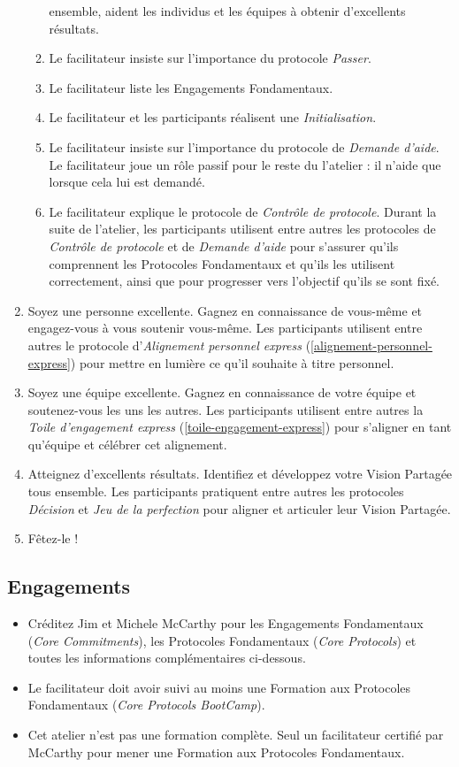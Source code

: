 \documentclass[paper=6in:9in,pagesize=pdftex,headinclude=on,footinclude=on,11pt]{scrbook}
\newcommand*{\numref}[1]{{\hyperref[{#1}]{\autoref*{#1}}}}
\begin{document}
\begin{enumerate}
\begin{enumerate}
	      	      ensemble, aident les individus et les équipes à obtenir d'excellents résultats.
	      	\item Le facilitateur insiste sur l'importance du protocole \emph{Passer}.
	      	\item Le facilitateur liste les Engagements Fondamentaux.
	      	\item Le facilitateur et les participants réalisent une \emph{Initialisation}.
	      	\item Le facilitateur insiste sur l'importance du protocole de \emph{Demande d'aide}. Le facilitateur joue un rôle passif pour le reste du l'atelier :
	      	      il n'aide que lorsque cela lui est demandé.
	      	\item Le facilitateur explique le protocole de \emph{Contrôle de protocole}. Durant la suite de l'atelier, les participants utilisent entre autres les
	      	      protocoles de \emph{Contrôle de protocole} et de \emph{Demande d'aide} pour s'assurer qu'ils comprennent les Protocoles Fondamentaux et qu'ils les
	      	      utilisent correctement, ainsi que pour progresser vers l'objectif qu'ils se sont fixé.
	      \end{enumerate}
	\item Soyez une personne excellente. Gagnez en connaissance de vous-même et engagez-vous à vous soutenir vous-même. Les participants utilisent entre
	      autres le protocole d'\emph{Alignement personnel express} (\numref{alignement-personnel-express}) pour mettre en lumière ce qu'il souhaite à titre personnel.
   	\item Soyez une équipe excellente. Gagnez en connaissance de votre équipe et soutenez-vous les uns les autres. Les participants utilisent entre autres la
   	      \emph{Toile d'engagement express} (\numref{toile-engagement-express}) pour s'aligner en tant qu'équipe et célébrer cet alignement.
   	\item Atteignez d'excellents résultats. Identifiez et développez votre Vision Partagée tous ensemble. Les participants pratiquent entre autres les protocoles
   	      \emph{Décision} et \emph{Jeu de la perfection} pour aligner et articuler leur Vision Partagée.
   	\item Fêtez-le !
\end{enumerate}

\subsection{Engagements}
\begin{itemize}
	\item Créditez Jim et Michele McCarthy pour les Engagements Fondamentaux (\emph{Core Commitments}), les Protocoles Fondamentaux (\emph{Core Protocols}) et toutes les
	      informations complémentaires ci-dessous.
	\item Le facilitateur doit avoir suivi au moins une Formation aux Protocoles Fondamentaux (\emph{Core Protocols BootCamp}).
	\item Cet atelier n'est pas une formation complète. Seul un facilitateur certifié par McCarthy pour mener une Formation aux Protocoles Fondamentaux.
\end{itemize}
\end{document}
